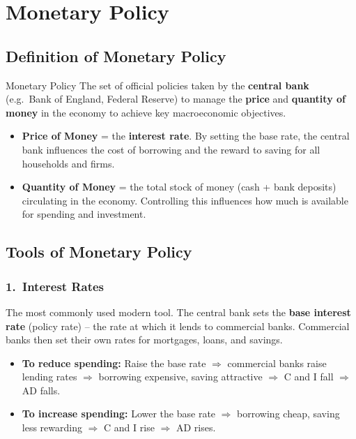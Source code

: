 \documentclass[11pt, a4paper, twoside]{book}
\begin{document}
\section{Monetary Policy}

\subsection{Definition of Monetary Policy}

\begin{keyterm}{Monetary Policy}
The set of official policies taken by the \textbf{central bank} (e.g.\ Bank of England, Federal Reserve) to manage the \textbf{price} and \textbf{quantity of money} in the economy to achieve key macroeconomic objectives.
\end{keyterm}

\begin{itemize}
  \item \textbf{Price of Money} = the \textbf{interest rate}. By setting the base rate, the central bank influences the cost of borrowing and the reward to saving for all households and firms.
  \item \textbf{Quantity of Money} = the total stock of money (cash + bank deposits) circulating in the economy. Controlling this influences how much is available for spending and investment.
\end{itemize}

\subsection{Tools of Monetary Policy}

\subsubsection{1.\ Interest Rates}

The most commonly used modern tool. The central bank sets the \textbf{base interest rate} (policy rate) -- the rate at which it lends to commercial banks. Commercial banks then set their own rates for mortgages, loans, and savings.

\begin{itemize}
  \item \textbf{To reduce spending:} Raise the base rate $\Rightarrow$ commercial banks raise lending rates $\Rightarrow$ borrowing expensive, saving attractive $\Rightarrow$ C and I fall $\Rightarrow$ AD falls.
  \item \textbf{To increase spending:} Lower the base rate $\Rightarrow$ borrowing cheap, saving less rewarding $\Rightarrow$ C and I rise $\Rightarrow$ AD rises.
\end{itemize}
\end{document}
